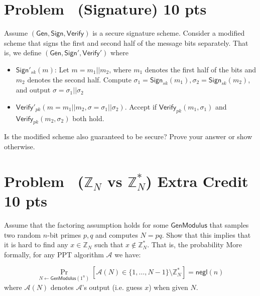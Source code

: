 \documentclass[11pt]{article}
\newcounter{pppp}
\newcommand{\prob}{\arabic{pppp}}  %
\newcommand{\increase}{\addtocounter{pppp}{1}}  %
\newcommand{\newproblem}[2]{\increase
\section*{Problem \prob~(#1) \hfill {#2}}}
\renewcommand{\gets}{\leftarrow}
\newcommand{\Gen}{\mathsf{Gen}}
\newcommand{\Sign}{\mathsf{Sign}}
\newcommand{\Verify}{\mathsf{Verify}}
\newcommand {\A} {\mathcal{A}}
\newcommand {\ZZ} {\mathbb{Z}}
\def \negl {\mathsf{negl}}
\begin{document}
\newproblem{Signature}{10 pts} 

Assume $(\Gen, \Sign, \Verify)$ is a secure signature scheme. Consider a modified scheme that signs the first and second half of the message bits separately. That is, we define  $(\Gen, \Sign', \Verify')$ where
	\begin{itemize}
		\item 	$\Sign'_{sk}(m)$: Let $m=m_1||m_2$, where $m_1$ denotes the first half of the bits and $m_2$ denotes the second half. Compute  $\sigma_1 = \Sign_{sk}(m_1), \sigma_2 = \Sign_{sk}(m_2)$, and output $\sigma = \sigma_1||\sigma_2$
        \item $\Verify'_{pk}(m = m_1||m_2, \sigma = \sigma_1||\sigma_2)$. Accept if $\Verify_{pk}(m_1,\sigma_1)$ and $\Verify_{pk}(m_2,\sigma_2)$ both hold. 	
	\end{itemize}
Is the modified scheme also guaranteed to be secure? Prove your answer or show otherwise. 


\newproblem{$\ZZ_N$ vs $\ZZ_N^*$}{Extra Credit 10 pts} 
Assume that the factoring assumption holds for some $\mathsf{GenModulus}$ that samples two random $n$-bit primes $p,q$ and computes $N=pq$. Show that this implies that %
it is hard to find any $x \in \ZZ_N$ such that $x \not \in \ZZ^*_N$. That is, the probability  More formally, for any PPT algorithm $\A$ we have:

$$\Pr_{N \gets \mathsf{GenModulus}(1^n)}[ \A(N) \in  \{1,\ldots,N-1\} \setminus \ZZ_N^* ] = \negl(n)$$
where $\A(N)$ denotes $\A$'s output (i.e. guess $x$) when given $N$. 
\end{document}
